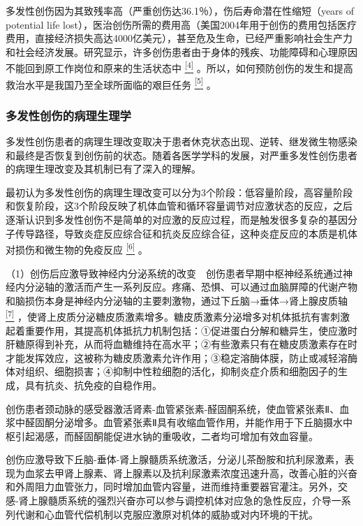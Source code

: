 多发性创伤因为其致残率高（严重创伤达36.1％），伤后寿命潜在性缩短（years
of potential life
lost），医治创伤所需的费用高（美国2004年用于创伤的费用包括医疗费用，直接经济损失高达4000亿美元），甚至危及生命，已经严重影响社会生产力和社会经济发展。研究显示，许多创伤患者由于身体的残疾、功能障碍和心理原因不能回到原工作岗位和原来的生活状态中
\protect\hyperlink{text00024.htmlux5cux23ch4-23}{\textsuperscript{{[}4{]}}}
。所以，如何预防创伤的发生和提高救治水平是我国乃至全球所面临的艰巨任务
\protect\hyperlink{text00024.htmlux5cux23ch5-23}{\textsuperscript{{[}5{]}}}
。

\subsubsection{多发性创伤的病理生理学}

多发性创伤患者的病理生理改变取决于患者休克状态出现、逆转、继发微生物感染和最终是否恢复到创伤前的状态。随着各医学学科的发展，对严重多发性创伤患者的病理生理改变及其机制已有了深入的理解。

最初认为多发性创伤的病理生理改变可以分为3个阶段：低容量阶段，高容量阶段和恢复阶段，这3个阶段反映了机体血管和循环容量调节对应激状态的反应，之后逐渐认识到多发性创伤不是简单的对应激的反应过程，而是触发很多复杂的基因分子传导路径，导致炎症反应综合征和抗炎反应综合征，这种炎症反应的本质是机体对损伤和微生物的免疫反应
\protect\hyperlink{text00024.htmlux5cux23ch6-23}{\textsuperscript{{[}6{]}}}
。

（1）创伤后应激导致神经内分泌系统的改变　创伤患者早期中枢神经系统通过神经内分泌轴的激活而产生一系列反应。疼痛、恐惧、可以通过血脑屏障的代谢产物和脑损伤本身是神经内分泌轴的主要刺激物，通过下丘脑→垂体→肾上腺皮质轴
\protect\hyperlink{text00024.htmlux5cux23ch7-23}{\textsuperscript{{[}7{]}}}
，使肾上皮质分泌糖皮质激素增多。糖皮质激素分泌增多对机体抵抗有害刺激起着重要作用，其提高机体抵抗力机制包括：①促进蛋白分解和糖异生，使应激时肝糖原得到补充，从而将血糖维持在高水平；②有些激素只有在糖皮质激素存在时才能发挥效应，这被称为糖皮质激素允许作用；③稳定溶酶体膜，防止或减轻溶酶体对组织、细胞损害；④抑制中性粒细胞的活化，抑制炎症介质和细胞因子的生成，具有抗炎、抗免疫的自稳作用。

创伤患者颈动脉的感受器激活肾素-血管紧张素-醛固酮系统，使血管紧张素Ⅱ、血浆中醛固酮分泌增多。血管紧张素Ⅱ具有收缩血管作用，并能作用于下丘脑摄水中枢引起渴感，而醛固酮能促进水钠的重吸收，二者均可增加有效血容量。

创伤应激导致下丘脑-垂体-肾上腺髓质系统激活，分泌儿茶酚胺和抗利尿激素，表现为血浆去甲肾上腺素、肾上腺素以及抗利尿激素浓度迅速升高，改善心脏的兴奋和外周阻力血管张力，同时增加血管内容量，进而维持重要器官灌注。另外，交感-肾上腺髓质系统的强烈兴奋亦可以参与调控机体对应急的急性反应，介导一系列代谢和心血管代偿机制以克服应激原对机体的威胁或对内环境的干扰。

